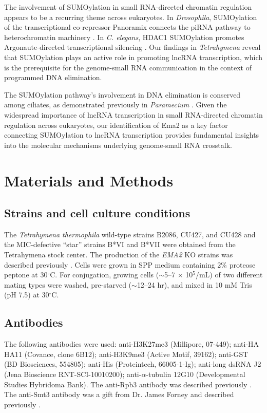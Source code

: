 \documentclass[11pt]{article}
\begin{document}
The involvement of SUMOylation in small RNA-directed chromatin regulation appears to be a recurring theme across eukaryotes. In \textit{Drosophila}, SUMOylation of the transcriptional co-repressor Panoramix connects the piRNA pathway to heterochromatin machinery \citep{batki2022}. In \textit{C. elegans}, HDAC1 SUMOylation promotes Argonaute-directed transcriptional silencing \citep{hdac2021}. Our findings in \textit{Tetrahymena} reveal that SUMOylation plays an active role in promoting lncRNA transcription, which is the prerequisite for the genome-small RNA communication in the context of programmed DNA elimination.

The SUMOylation pathway's involvement in DNA elimination is conserved among ciliates, as demonstrated previously in \textit{Paramecium} \citep{matsuda2006}. Given the widespread importance of lncRNA transcription in small RNA-directed chromatin regulation across eukaryotes, our identification of Ema2 as a key factor connecting SUMOylation to lncRNA transcription provides fundamental insights into the molecular mechanisms underlying genome-small RNA crosstalk.

\section{Materials and Methods}

\subsection{Strains and cell culture conditions}
The \textit{Tetrahymena thermophila} wild-type strains B2086, CU427, and CU428 and the MIC-defective ``star'' strains B*VI and B*VII were obtained from the Tetrahymena stock center. The production of the \textit{EMA2} KO strains was described previously \citep{shehzada2022}. Cells were grown in SPP medium \citep{gorovsky1975} containing 2\% proteose peptone at 30$^\circ$C. For conjugation, growing cells ($\sim$5--7 $\times$ 10$^5$/mL) of two different mating types were washed, pre-starved ($\sim$12--24 hr), and mixed in 10 mM Tris (pH 7.5) at 30$^\circ$C.

\subsection{Antibodies}
The following antibodies were used: anti-H3K27me3 (Millipore, 07-449); anti-HA HA11 (Covance, clone 6B12); anti-H3K9me3 (Active Motif, 39162); anti-GST (BD Biosciences, 554805); anti-His (Proteintech, 66005-1-Ig); anti-long dsRNA J2 (Jena Bioscience RNT-SCI-10010200); anti-$\alpha$-tubulin 12G10 (Developmental Studies Hybridoma Bank). The anti-Rpb3 antibody was described previously \citep{kataoka2017}. The anti-Smt3 antibody was a gift from Dr. James Forney and described previously \citep{nasir2015}.
\end{document}
